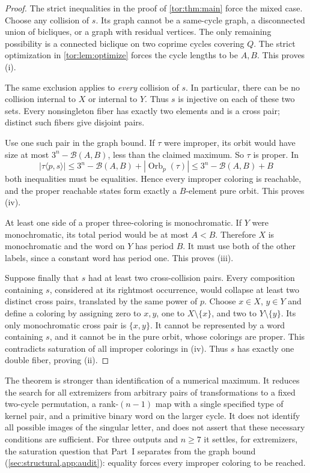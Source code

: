 \documentclass[11pt,a4paper]{article}
\numberwithin{equation}{section}
\theoremstyle{definition}
\theoremstyle{remark}
\newcommand{\Orb}{\operatorname{Orb}}
\newcommand{\Bip}{\mathcal B}
\begin{document}
\begin{proof}
The strict inequalities in the proof of \cref{tor:thm:main} force the mixed
case. Choose any collision of $s$. Its graph cannot be a same-cycle graph, a
disconnected union of bicliques, or a graph with residual vertices. The only
remaining possibility is a connected biclique on two coprime cycles covering
$Q$. The strict optimization in \cref{tor:lem:optimize} forces the cycle
lengths to be $A,B$. This proves (i).

The same exclusion applies to \emph{every} collision of $s$. In particular,
there can be no collision internal to $X$ or internal to $Y$. Thus $s$ is
injective on each of these two sets. Every nonsingleton fiber has exactly two
elements and is a cross pair; distinct such fibers give disjoint pairs.

Use one such pair in the graph bound. If $\tau$ were improper, its orbit would
have size at most $3^n-\Bip(A,B)$, less than the claimed maximum. So $\tau$ is
proper. In
\[
 |\tau\langle p,s\rangle|
 \le3^n-\Bip(A,B)+|\Orb_p(\tau)|
 \le3^n-\Bip(A,B)+B
\]
both inequalities must be equalities. Hence every improper coloring is
reachable, and the proper reachable states form exactly a $B$-element pure
orbit. This proves (iv).

At least one side of a proper three-coloring is monochromatic. If $Y$ were
monochromatic, its total period would be at most $A<B$. Therefore $X$ is
monochromatic and the word on $Y$ has period $B$. It must use both of the
other labels, since a constant word has period one. This proves (iii).

Suppose finally that $s$ had at least two cross-collision pairs. Every
composition containing $s$, considered at its rightmost occurrence, would
collapse at least two distinct cross pairs, translated by the same power of
$p$. Choose $x\in X$, $y\in Y$ and define a coloring by assigning zero to
$x,y$, one to $X\setminus\{x\}$, and two to $Y\setminus\{y\}$. Its only
monochromatic cross pair is $\{x,y\}$. It cannot be represented by a word
containing $s$, and it cannot be in the pure orbit, whose colorings are
proper. This contradicts saturation of all improper colorings in (iv). Thus
$s$ has exactly one double fiber, proving (ii).
\end{proof}

The theorem is stronger than identification of a numerical maximum. It reduces
the search for all extremizers from arbitrary pairs of transformations to a
fixed two-cycle permutation, a rank-$(n-1)$ map with a single specified type
of kernel pair, and a primitive binary word on the larger cycle. It does not
identify all possible images of the singular letter, and does not assert that
these necessary conditions are sufficient. For three outputs and $n\ge7$ it
settles, for extremizers, the saturation question that Part~I separates from
the graph bound (\cref{sec:structural,app:audit}): equality forces every
improper coloring to be reached.
\end{document}
